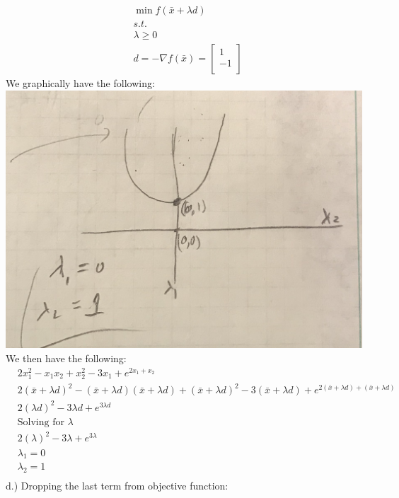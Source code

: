\documentclass[12pt]{article}
\begin{document}
    \begin{align*}
        &\min f(\bar x + \lambda d)\\
        &s.t. \\
        &\lambda \geq 0\\
        &d = -\nabla f(\bar x) = 
        \begin{bmatrix}
            1\\
            -1\\
        \end{bmatrix}
    \end{align*}
We graphically have the following:\\
    \includegraphics[width=\textwidth]{BSS4-4.jpeg}\\
We then have the following: 
    \begin{align*}
        &2x_1^2 -x_1x_2 + x_2^2 - 3x_1 + e^{2x_1 + x_2}\\
        &2(\bar x + \lambda d)^2 -(\bar x + \lambda d)(\bar x + \lambda d) + (\bar x + \lambda d)^2 - 3(\bar x + \lambda d)+ e^{2(\bar x + \lambda d) + (\bar x + \lambda d)}\\
        &2(\lambda d)^2 - 3\lambda  d + e^{3 \lambda d}\\
        &\text{Solving for } \lambda \\ 
        &2(\lambda)^2 - 3\lambda+ e^{3 \lambda}\\
        &\lambda_1 = 0\\
        &\lambda_2 = 1\\
    \end{align*}
d.) Dropping the last term from objective function:\\
\end{document}
